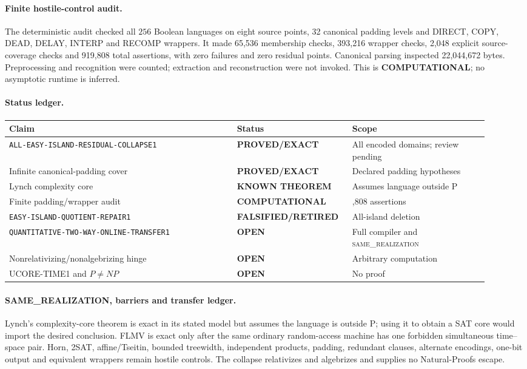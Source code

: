 \documentclass[11pt]{article}
\newcommand{\statusproved}{\textcolor{proved}{\textbf{PROVED/EXACT}}}
\newcommand{\statusopen}{\textcolor{openstatus}{\textbf{OPEN}}}
\newcommand{\statusretired}{\textcolor{retired}{\textbf{FALSIFIED/RETIRED}}}
\newcommand{\same}{\textnormal{\textsc{same\_realization}}}
\begin{document}
\paragraph{Finite hostile-control audit.}
The deterministic audit checked all \(256\) Boolean languages on eight source
points, 32 canonical padding levels and DIRECT, COPY, DEAD, DELAY, INTERP and
RECOMP wrappers.  It made 65,536 membership checks, 393,216 wrapper checks,
2,048 explicit source-coverage checks and 919,808 total assertions, with zero
failures and zero residual points.  Canonical parsing inspected 22,044,672
bytes.  Preprocessing and recognition were counted; extraction and
reconstruction were not invoked.  This is \textbf{COMPUTATIONAL}; no
asymptotic runtime is inferred.

\paragraph{Status ledger.}
\begin{center}\scriptsize
\begin{tabular}{>{\raggedright\arraybackslash}p{0.45\linewidth}>{\raggedright\arraybackslash}p{0.20\linewidth}>{\raggedright\arraybackslash}p{0.27\linewidth}}
\toprule
Claim & Status & Scope\\ \midrule
\texttt{ALL-EASY-ISLAND-RESIDUAL-COLLAPSE1} & \statusproved & All encoded domains; review pending\\
Infinite canonical-padding cover & \statusproved & Declared padding hypotheses\\
Lynch complexity core & \textbf{KNOWN THEOREM} & Assumes language outside P\\
Finite padding/wrapper audit & \textbf{COMPUTATIONAL} & 919,808 assertions\\
\texttt{EASY-ISLAND-QUOTIENT-REPAIR1} & \statusretired & All-island deletion\\
\texttt{QUANTITATIVE-TWO-WAY-ONLINE-TRANSFER1} & \statusopen & Full compiler and \same\\
Nonrelativizing/nonalgebrizing hinge & \statusopen & Arbitrary computation\\
UCORE-TIME1 and \(P\ne NP\) & \statusopen & No proof\\
\bottomrule
\end{tabular}
\end{center}

\paragraph{SAME\_REALIZATION, barriers and transfer ledger.}
Lynch's complexity-core theorem is exact in its stated model but assumes the
language is outside P; using it to obtain a SAT core would import the desired
conclusion.  FLMV is exact only after the same ordinary random-access machine
has one forbidden simultaneous time--space pair.  Horn, 2SAT,
affine/Tseitin, bounded treewidth, independent products, padding, redundant
clauses, alternate encodings, one-bit output and equivalent wrappers remain
hostile controls.  The collapse relativizes and algebrizes and supplies no
Natural-Proofs escape.
\end{document}
